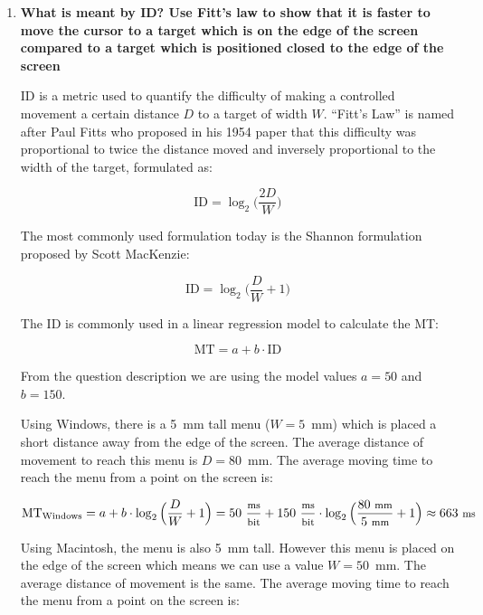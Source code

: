 \begin{enumerate}[resume*]
\item \textbf{What is meant by \acf{ID}? Use Fitt's law to show that it is faster to move the cursor to a target which is on the edge of the screen compared to a target which is positioned closed to the edge of the screen}

\acf{ID} is a metric used to quantify the difficulty of making a controlled movement a certain distance $D$ to a target of width $W$. ``Fitt's Law'' is named after Paul Fitts who proposed in his 1954 paper that this difficulty was proportional to twice the distance moved and inversely proportional to the width of the target, formulated as:

\begin{displaymath}
\text{ID} = \log_2\big(\frac{2D}{W}\big)
\end{displaymath}

The most commonly used formulation today is the Shannon formulation proposed by Scott MacKenzie:

\begin{displaymath}
\text{ID} = \log_2\big(\frac{D}{W} + 1\big)
\end{displaymath}

The \ac{ID} is commonly used in a linear regression model to calculate the \ac{MT}:

\begin{displaymath}
\text{MT} = a + b \cdot \text{ID}
\end{displaymath}

From the question description we are using the model values $a = 50$ and $b = 150$.

Using Windows, there is a 5~mm tall menu ($W = 5$~mm) which is placed a short distance away from the edge of the screen. The average distance of movement to reach this menu is $D = 80$~mm. The average moving time to reach the menu from a point on the screen is:

\begin{displaymath}
\text{MT}_\text{Windows} = a + b \cdot \log_2\Big(\frac{D}{W} + 1\Big) = 50~{\footnotesize \frac{\text{ms}}{\text{bit}}} + 150~{\footnotesize \frac{\text{ms}}{\text{bit}}} \cdot \log_2\Big(\frac{80~\text{\footnotesize mm}}{5~\text{\footnotesize mm}} + 1\Big) \approx 663~\text{\footnotesize ms}
\end{displaymath}

Using Macintosh, the menu is also 5~mm tall. However this menu is placed on the edge of the screen which means we can use a value $W = 50$~mm. The average distance of movement is the same. The average moving time to reach the menu from a point on the screen is:


\end{enumerate}
